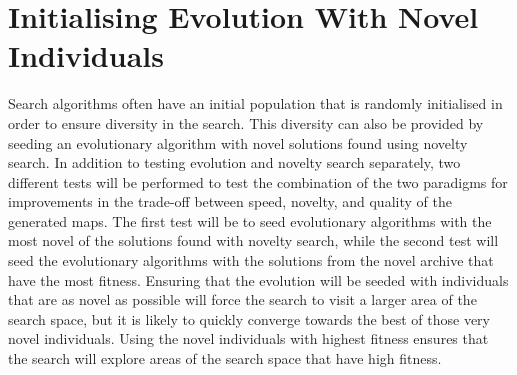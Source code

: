 \section{Initialising Evolution With Novel Individuals}
\label{methodology_evolutionnovelseeds}
Search algorithms often have an initial population that is randomly initialised in order to ensure diversity in the search. This diversity can also be provided by seeding an evolutionary algorithm with novel solutions found using novelty search. In addition to testing evolution and novelty search separately, two different tests will be performed to test the combination of the two paradigms for improvements in the trade-off between speed, novelty, and quality of the generated maps. The first test will be to seed evolutionary algorithms with the most novel of the solutions found with novelty search, while the second test will seed the evolutionary algorithms with the solutions from the novel archive that have the most fitness. Ensuring that the evolution will be seeded with individuals that are as novel as possible will force the search to visit a larger area of the search space, but it is likely to quickly converge towards the best of those very novel individuals. Using the novel individuals with highest fitness ensures that the search will explore areas of the search space that have high fitness.